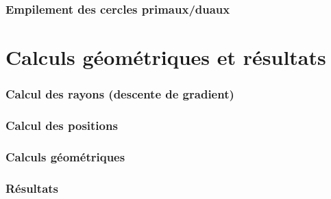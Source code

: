 \documentclass{beamer}
\begin{document}
\begin{frame}
\frametitle{Empilement des cercles primaux/duaux}
\end{frame}


\section{Calculs géométriques et résultats}
\begin{frame}
\frametitle{Calcul des rayons (descente de gradient)}
\end{frame}

\begin{frame}
\frametitle{Calcul des positions}
\end{frame}

\begin{frame}
\frametitle{Calculs géométriques}
\end{frame}

\begin{frame}
\frametitle{Résultats}
\end{frame}
\end{document}
